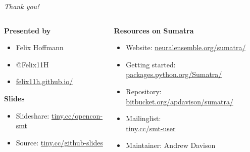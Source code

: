 

\begin{frame}
  \begin{center} 
    \Large \textit{Thank you!}
  \end{center}
  
  \vspace{0.35cm}

  \begin{columns}[t]
    \begin{column}{0.4\textwidth}        
      \textbf{Presented by}
      \normalsize
      \vspace{0.18cm}
      \begin{itemize}[leftmargin=0.6cm]
        \item[] Felix Hoffmann
        \item[] @Felix11H
        \item[] \href{http://felix11h.github.io/}{felix11h.github.io/}
      \end{itemize}

      \vspace{0.38cm}
      \textbf{Slides}
      \normalsize
      \vspace{0.18cm}
      \begin{itemize}[leftmargin=0.6cm]
        \item[] Slideshare: %
          \href{http://tiny.cc/opencon-smt}{tiny.cc/opencon-smt}
        \item[] Source: %
          \href{http://tiny.cc/github-slides}{tiny.cc/github-slides}
      \end{itemize}
    \end{column}
    \begin{column}{0.64\textwidth}
      \textbf{Resources on Sumatra}
      \vspace{0.28cm}
      \normalsize 
      \begin{itemize}[leftmargin=0.6cm]
        \item[] Website: %
          \href{http://neuralensemble.org/sumatra/}{%
            neuralensemble.org/sumatra/}\\
        \item[]Getting started: %
          \href{http://packages.python.org/Sumatra/}{%
            packages.python.org/Sumatra/}\\
        \item[]Repository: %
          \href{http://bitbucket.org/apdavison/sumatra/}{%
            bitbucket.org/apdavison/sumatra/}
        \item[] Mailinglist: \\%
          \href{http://tiny.cc/smt-user}{tiny.cc/smt-user}
        \item[] Maintainer: Andrew Davison 
      \end{itemize}
    \end{column}
  \end{columns}


\end{frame}
